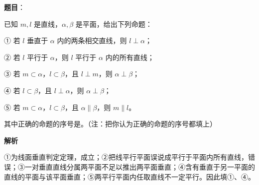 \begin{answer}

\textbf{题目}：

已知 $m,l$ 是直线，$\alpha,\beta$ 是平面，给出下列命题：

① 若 $l$ 垂直于 $\alpha$ 内的两条相交直线，则 $l\perp\alpha$；

② 若 $l$ 平行于 $\alpha$，则 $l$ 平行于 $\alpha$ 内的所有直线；

③ 若 $m\subset\alpha$，$l\subset\beta$，且 $l\perp m$，则 $\alpha\perp\beta$；

④ 若 $l\subset\beta$，且 $l\perp\alpha$，则 $\alpha\perp\beta$；

⑤ 若 $m\subset\alpha$，$l\subset\beta$，且 $\alpha\parallel\beta$，则 $m\parallel l$。

其中正确的命题的序号是\gkblank{}。（注：把你认为正确的命题的序号都填上）

\textbf{解析}

①为线面垂直判定定理，成立；②把线平行平面误说成平行于平面内所有直线，错误；③一对垂直直线分属两平面不足以推出两平面垂直；④含有垂直于另一平面的直线的平面与该平面垂直；⑤两平行平面内任取直线不一定平行。因此填①、④。


\end{answer}

